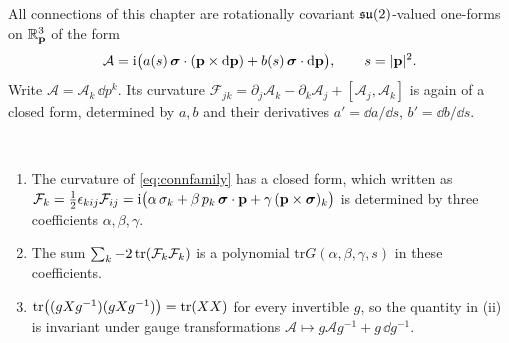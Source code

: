 All connections of this chapter are rotationally covariant $\mathfrak{su}(2)$-valued one-forms on $\mathbb{R}^3_{\mathbf p}$ of the form
\begin{equation}\label{eq:connfamily}
\mathcal A=\mathrm{i}\bigl(a(s)\,\boldsymbol{\sigma}\cdot(\mathbf p\times\mathrm{d}\mathbf p)+b(s)\,\boldsymbol{\sigma}\cdot\mathrm{d}\mathbf p\bigr),\qquad s=|\mathbf p|^2 .
\end{equation}
Write $\mathcal A=\mathcal A_k\,\dd p^k$. Its curvature $\mathcal F_{jk}=\partial_j\mathcal A_k-\partial_k\mathcal A_j+[\mathcal A_j,\mathcal A_k]$ is again of a closed form, determined by $a,b$ and their derivatives $a'=\dd a/\dd s$, $b'=\dd b/\dd s$.

\begin{proposition}\label{prop:curvinv}\ver\
\begin{enumerate}[label=(\roman*)]
\item The curvature of \eqref{eq:connfamily} has a closed form, which written as $\mathcal F_k=\frac12\epsilon_{kij}\mathcal F_{ij}=\mathrm{i}\bigl(\alpha\,\sigma_k+\beta\,p_k\,\boldsymbol{\sigma}\cdot\mathbf p+\gamma\,(\mathbf p\times\boldsymbol{\sigma})_k\bigr)$ is determined by three coefficients $\alpha,\beta,\gamma$.
\item The sum $\sum_k-2\operatorname{tr}(\mathcal F_k\mathcal F_k)$ is a polynomial $\mathrm{tr}G(\alpha,\beta,\gamma,s)$ in these coefficients.
\item $\operatorname{tr}\bigl((gXg^{-1})(gXg^{-1})\bigr)=\operatorname{tr}(XX)$ for every invertible $g$, so the quantity in (ii) is invariant under gauge transformations $\mathcal A\mapsto g\mathcal Ag^{-1}+g\,\dd g^{-1}$.
\end{enumerate}
\end{proposition}

